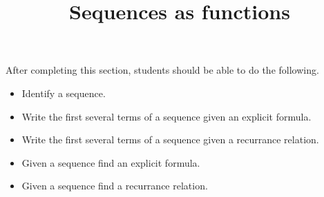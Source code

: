 \documentclass{ximera}
\title{Sequences as functions}
\begin{document}
\begin{abstract}
\end{abstract}

\maketitle

\begin{sectionOutcomes}

After completing this section, students should be able to do the following.

\begin{itemize}
\item Identify a sequence.
\item Write the first several terms of a sequence given an explicit formula.
\item Write the first several terms of a sequence given a recurrance
  relation.
\item Given a sequence find an explicit formula.
\item Given a sequence find a recurrance relation.
\end{itemize}

\end{sectionOutcomes}
\end{document}
